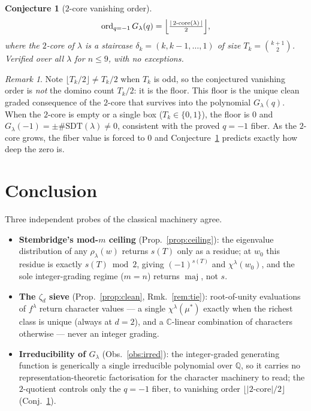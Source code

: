 \documentclass{article}
\newtheorem{conjecture}{Conjecture}
\theoremstyle{definition}
\theoremstyle{remark}
\newtheorem{remark}{Remark}
\newcommand{\maj}{\operatorname{maj}}
\newcommand{\ord}{\operatorname{ord}}
\newcommand{\C}{\mathbb{C}}
\newcommand{\Q}{\mathbb{Q}}
\begin{document}
\begin{conjecture}[$2$-core vanishing order]\label{conj:2core}
\[
\ord_{q=-1} G_\lambda(q) = \Bigl\lfloor \tfrac{|\,2\text{-}\mathrm{core}(\lambda)\,|}{2} \Bigr\rfloor,
\]
where the $2$-core of $\lambda$ is a staircase $\delta_k = (k, k-1, \dots, 1)$ of
size $T_k = \binom{k+1}{2}$. Verified over all $\lambda$ for $n \le 9$, with no
exceptions.
\end{conjecture}

\begin{remark}
Note $\lfloor T_k/2 \rfloor \neq T_k/2$ when $T_k$ is odd, so the conjectured
vanishing order is \emph{not} the domino count $T_k/2$: it is the floor.
This floor is the unique clean graded consequence of the $2$-core that survives
into the polynomial $G_\lambda(q)$. When the $2$-core is empty or a single box
($T_k \in \{0,1\}$), the floor is $0$ and $G_\lambda(-1) = \pm\#\mathrm{SDT}(\lambda)
\neq 0$, consistent with the proved $q=-1$ fiber. As the $2$-core grows, the
fiber value is forced to $0$ and Conjecture~\ref{conj:2core} predicts exactly how
deep the zero is.
\end{remark}

\section{Conclusion}

Three independent probes of the classical machinery agree.

\begin{itemize}
\item \textbf{Stembridge's mod-$m$ ceiling} (Prop.~\ref{prop:ceiling}): the
eigenvalue distribution of any $\rho_\lambda(w)$ returns $s(T)$ only as a residue;
at $w_0$ this residue is exactly $s(T) \bmod 2$, giving $(-1)^{s(T)}$ and
$\chi^\lambda(w_0)$, and the sole integer-grading regime ($m=n$) returns $\maj$,
not $s$.
\item \textbf{The $\zeta_d$ sieve} (Prop.~\ref{prop:clean}, Rmk.~\ref{rem:tie}):
root-of-unity evaluations of $f^\lambda$ return character values --- a single
$\chi^\lambda(\mu^*)$ exactly when the richest class is unique (always at $d=2$),
and a $\C$-linear combination of characters otherwise --- never an integer
grading.
\item \textbf{Irreducibility of $G_\lambda$} (Obs.~\ref{obs:irred}): the
integer-graded generating function is generically a single irreducible
polynomial over $\Q$, so it carries no representation-theoretic factorisation for
the character machinery to read; the $2$-quotient controls only the $q=-1$ fiber,
to vanishing order $\lfloor |2\text{-core}|/2\rfloor$
(Conj.~\ref{conj:2core}).
\end{itemize}
\end{document}
